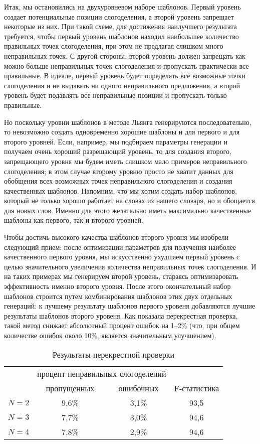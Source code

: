 \documentclass[12pt,a4paper,oneside]{extarticle}
\begin{document}
Итак, мы остановились на двухуровневом наборе шаблонов. Первый уровень создает потенциальные позиции слогоделения, а второй уровень запрещает некоторые из них. При такой схеме, для достижения наилучшего результата требуется, чтобы первый уровень шаблонов находил наибольшее количество правильных точек слогоделения, при этом не предлагая слишком много неправильных точек. С другой стороны, второй уровень должен запрещать как можно больше неправильных точек слогоделения и пропускать практически все правильные. В идеале, первый уровень будет определять все возможные точки слогоделения и не выдавать ни одного неправильного предложения, а второй уровень будет подавлять все неправильные позиции и пропускать только правильные. 

Но поскольку уровни шаблонов в методе Льянга генерируются последовательно, то невозможно создать одновременно хорошие шаблоны и для первого и для второго уровней. Если, например, мы подбираем параметры генерации и получаем очень хороший разрешающий уровень, то для создания второго, запрещающего уровня мы будем иметь слишком мало примеров неправильного слогоделения; в этом случае второму уровню просто не хватит данных для обобщения всех возможных точек неправильного слогоделения и создания качественных шаблонов. Напомним, что мы хотим создать набор шаблонов, который не только хорошо работает на словах из нашего словаря, но и обощается для новых слов. Именно для этого желательно иметь максимально качественные шаблоны как первого, так и второго уровней.

Чтобы достичь высокого качества шаблонов второго уровня мы изобрели следующий прием: после оптимизации параметров для получения наиболее качественного первого уровня, мы искусственно ухудшаем первый уровень с целью значительного увеличения количества неправильных точек слогоделения. И на таких примерах мы генерируем второй уровень, стараясь оптимизаровать эффективность именно второго уровня. После этого окончательный набор шаблонов строится путем комбинирования шаблонов этих двух отдельных генераций: к лучшему результату шаблонов первого уровеня добавляются лучшие результаты шаблонов второго уровеня. Как показала перекрестная проверка, такой метод снижает абсолютный процент ошибок на 1--2\% (что, при общем количестве ошибок около 10\%, является значительным улучшением).

\begin{table}[ht]
\centering
\caption{Результаты перекрестной проверки \label{validation_results}}
\begin{tabular}{cccc}
		&	\multicolumn{2}{c}{процент неправильных слогоделений} & \\
		&	пропущенных		& ошибочных	& F-статистика \\
\hline
$N = 2$	& 	9,6\%			& 	3,1\% 	&	93,5 \\
$N = 3$ 	& 	7,7\%			& 	3,0\% 	& 	94,6	\\
$N = 4$ 	&	7,8\%			& 	2,9\% 	& 	94,6	\\
\hline
\end{tabular}
\end{table}
\end{document}
